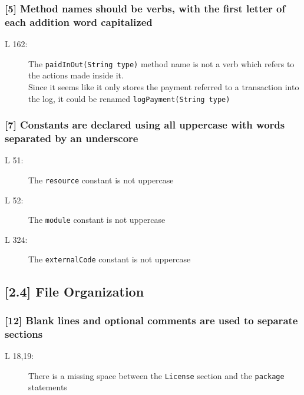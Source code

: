 \subsubsection*{[5] Method names should be verbs, with the first letter of each addition word capitalized}
\begin{description}
	\item[L 162:] The {\tt paidInOut(String type)} method name is not a verb which refers to the actions made inside it. \\Since it seems like it only stores the payment referred to a transaction into the log, it could be renamed {\tt logPayment(String type)}
\end{description}

\subsubsection*{[7] Constants are declared using all uppercase with words separated by an underscore}
\begin{description}
	\item[L 51:] The {\tt resource} constant is not uppercase
	\item[L 52:] The {\tt module} constant is not uppercase
	\item[L 324:] The {\tt externalCode} constant is not uppercase
\end{description}

\subsection*{[2.4] File Organization}

\subsubsection*{[12] Blank lines and optional comments are used to separate sections}
\begin{description}
	\item[L 18,19:] There is a missing space between the {\tt License} section and the {\tt package} statements
\end{description}

